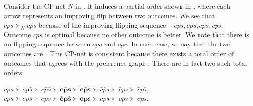 Consider the CP-net $N$ in .
It induces a partial order shown in ,
where each arrow represents an improving flip between two outcomes.
We see that $c\bar{p}\bar{s} \succ_N \bar{c}ps$
because of the improving flipping sequence --
$c\bar{p}\bar{s},\bar{c}\bar{p}\bar{s},\bar{c}\bar{p}s,\bar{c}ps$.
Outcome $cps$ is optimal because no other outcome is
better.
We note that there is no flipping sequence between
$c\bar{p}s$ and $\bar{c}\bar{p}\bar{s}$.
In such case, we say that the two outcomes are .
This CP-net is consistent because there exists a total order
of outcomes that agrees with the preference graph .
There are in fact two such total orders:

\begin{center}
	$cps \succ cp\bar{s} \succ c\bar{p}\bar{s} 
		\succ \bm{c\bar{p}s} \succ \bm{\bar{c}\bar{p}\bar{s}} 
		\succ \bar{c}\bar{p}s \succ \bar{c}ps \succ \bar{c}p\bar{s}$,\\
	$cps \succ cp\bar{s} \succ c\bar{p}\bar{s} 
		\succ \bm{\bar{c}\bar{p}\bar{s}} \succ \bm{c\bar{p}s}
		\succ \bar{c}\bar{p}s \succ \bar{c}ps \succ \bar{c}p\bar{s}$.
\end{center}


